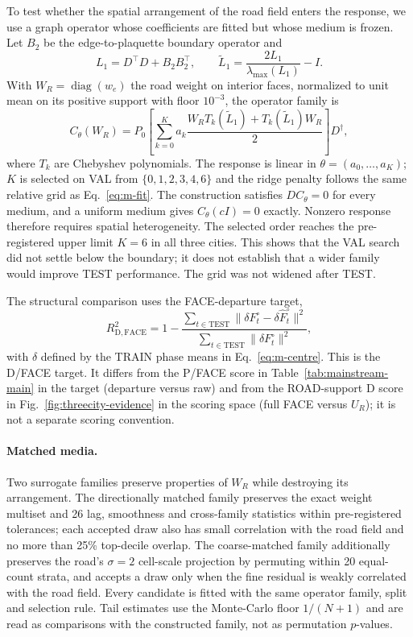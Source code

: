\documentclass[11pt]{article}
\begin{document}
To test whether the spatial arrangement of the road field enters the response, we use a graph operator whose coefficients are fitted but whose medium is frozen. Let $B_2$ be the edge-to-plaquette boundary operator and
\begin{equation}\label{eq:m-roadlap}
 L_1=D^\top D+B_2B_2^\top,\qquad
 \tilde L_1=\frac{2L_1}{\lambda_{\max}(L_1)}-I .
\end{equation}
With $W_R=\operatorname{diag}(w_e)$ the road weight on interior faces, normalized to unit mean on its positive support with floor $10^{-3}$, the operator family is
\begin{equation}\label{eq:m-roadop}
 C_\theta(W_R)=P_0\left[\sum_{k=0}^{K}a_k
 \frac{W_RT_k(\tilde L_1)+T_k(\tilde L_1)W_R}{2}\right]D^\dagger ,
\end{equation}
where $T_k$ are Chebyshev polynomials. The response is linear in $\theta=(a_0,\dots,a_K)$; $K$ is selected on VAL from $\{0,1,2,3,4,6\}$ and the ridge penalty follows the same relative grid as Eq.~\ref{eq:m-fit}. The construction satisfies $DC_\theta=0$ for every medium, and a uniform medium gives $C_\theta(cI)=0$ exactly. Nonzero response therefore requires spatial heterogeneity. The selected order reaches the pre-registered upper limit \(K=6\) in all three cities. This shows that the VAL search did not settle below the boundary; it does not establish that a wider family would improve TEST performance. The grid was not widened after TEST.

The structural comparison uses the FACE-departure target,
\begin{equation}\label{eq:m-facedep}
 R^2_{\mathrm{D,FACE}}=1-
 \frac{\sum_{t\in\mathrm{TEST}}\|\delta F_t^\circ-\delta\widehat F_t^\circ\|^2}
 {\sum_{t\in\mathrm{TEST}}\|\delta F_t^\circ\|^2},
\end{equation}
with $\delta$ defined by the TRAIN phase means in Eq.~\ref{eq:m-centre}. This is the D/FACE target. It differs from the P/FACE score in Table~\ref{tab:mainstream-main} in the target (departure versus raw) and from the ROAD-support D score in Fig.~\ref{fig:threecity-evidence} in the scoring space (full FACE versus \(U_R\)); it is not a separate scoring convention.

\paragraph{Matched media.} Two surrogate families preserve properties of $W_R$ while destroying its arrangement. The directionally matched family preserves the exact weight multiset and 26 lag, smoothness and cross-family statistics within pre-registered tolerances; each accepted draw also has small correlation with the road field and no more than 25\% top-decile overlap. The coarse-matched family additionally preserves the road's $\sigma=2$ cell-scale projection by permuting within 20 equal-count strata, and accepts a draw only when the fine residual is weakly correlated with the road field. Every candidate is fitted with the same operator family, split and selection rule. Tail estimates use the Monte-Carlo floor $1/(N+1)$ and are read as comparisons with the constructed family, not as permutation $p$-values.
\end{document}
